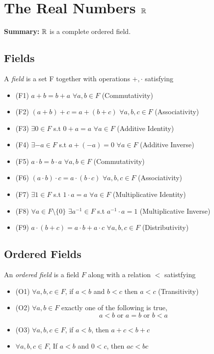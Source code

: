\documentclass[openany]{report}
\begin{document}
\chapter{The Real Numbers $\mathbb{R}$}
\begin{center}
    \textbf{Summary:} $\mathbb{R}$ is a complete ordered field.
\end{center}
\section{Fields}
\begin{definition}
    A \emph{field} is a set F together with operations $+,\cdot$ satisfying
    \begin{itemize}
        \item (F1) $a+b=b+a$ $\forall a,b \in F$ (Commutativity)
        \item (F2) $(a + b) + c = a + (b + c)$ $\forall a,b,c \in F$     (Associativity)
        \item (F3) $\exists 0 \in F$ s.t $0 + a = a$ $\forall a \in F$ (Additive Identity)
        \item (F4) $\exists -a \in F$ s.t $a + (-a) = 0$ $\forall a \in F$ (Additive Inverse)
        \item (F5) $a\cdot b = b \cdot a$ $\forall a,b \in F$ (Commutativity)
        \item (F6) $(a \cdot b) \cdot c = a \cdot (b \cdot c)$ $\forall a,b,c \in F$ (Associativity)
        \item (F7) $\exists 1 \in F$ s.t $1 \cdot a = a$ $\forall a \in F$ (Multiplicative Identity)
        \item (F8) $\forall a \in F \setminus \{0\}$ $\exists a^{-1} \in F$ s.t $a^{-1} \cdot a = 1$ (Multiplicative Inverse)
        \item (F9) $a \cdot (b + c) = a \cdot b + a \cdot c$ $\forall a,b,c \in F$ (Distributivity)
    \end{itemize}
\end{definition}

\section{Ordered Fields}

\begin{definition}
    An \emph{ordered field} is a field $F$ along with a relation $<$ satistfying
    \begin{itemize}
        \item (O1) $\forall a,b,c \in F$, if  $a < b$ and $b < c$ then $a<c$ (Transitivity)
        \item (O2) $\forall a,b \in F$ exactly one of the following is true,
        \[a < b \text{ or } a = b \text{ or } b < a\]
        \item (O3) $\forall a,b,c \in F$, if $a < b$, then $a + c < b + c$
        \item $\forall a,b,c \in F$, If $a < b$ and $0 < c$, then $ac < bc$
    \end{itemize}
\end{definition}
\end{document}
